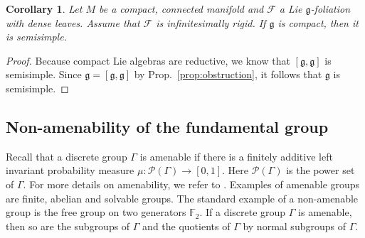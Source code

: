 \documentclass[11pt, letterpaper, oneside,reqno]{amsart}
\theoremstyle{plain}
\newtheorem{cor}[thm]{Corollary}
\theoremstyle{underline}
\theoremstyle{definition}
\theoremstyle{remark}
\begin{document}
\color{black}	
	\begin{cor}\label{cor:semisimple}
		Let $M$ be a compact, connected manifold and $\mathcal{F}$ a Lie $\mathfrak{g}$-foliation with dense leaves. Assume that $\mathcal{F}$ is infinitesimally rigid. If $\mathfrak{g}$ is compact, then it is semisimple.
	\end{cor}
	\begin{proof}
		Because compact Lie algebras are reductive, we know that $[\mathfrak{g},\mathfrak{g}]$ is semisimple. Since $\mathfrak{g}=[\mathfrak{g},\mathfrak{g}]$ by Prop.~\ref{prop:obstruction}, it follows that $\mathfrak{g}$ is semisimple.
	\end{proof}
	
	\subsection{Non-amenability of the fundamental group}
	
	Recall that a discrete group $\Gamma$ is amenable if there is a finitely additive left invariant probability measure $\mu:\mathcal{P}(\Gamma)\rightarrow[0,1]$. Here $\mathcal{P}(\Gamma)$ is the power set of $\Gamma$. For more details on amenability, we refer to \cite{Juschenko}. Examples of amenable groups are finite, abelian and solvable groups. The standard example of a non-amenable group is the free group on two generators $\mathbb{F}_{2}$. If a discrete group $\Gamma$ is amenable, then so are the subgroups of $\Gamma$ and the quotients of $\Gamma$ by normal subgroups of $\Gamma$.
	
\end{document}
